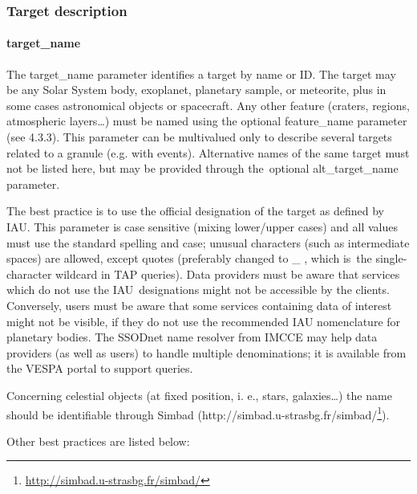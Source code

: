 \documentclass[11pt,a4paper]{ivoa}
\begin{document}
\subsubsection{Target description}

\paragraph{target\_name}

The target\_name parameter identifies a target by name or ID. The target may be any Solar System body, exoplanet, planetary sample, or meteorite, plus in some cases astronomical objects or spacecraft. Any other feature (craters, regions, atmospheric layers…) must be named using the optional feature\_name parameter (see 4.3.3). This parameter can be multivalued only to describe several targets related to a granule (e.g. with events). Alternative names of the same target must not be listed here, but may be provided through the optional alt\_target\_name parameter. 

The best practice is to use the official designation of the target as defined by IAU. This parameter is case sensitive (mixing lower/upper cases) and all values must use the standard spelling and case; unusual characters (such as intermediate spaces) are allowed, except quotes (preferably changed to \_ , which is the single-character wildcard in TAP queries). Data providers must be aware that services which do not use the IAU designations might not be accessible by the clients. Conversely, users must be aware that some services containing data of interest might not be visible, if they do not use the recommended IAU nomenclature for planetary bodies. The SSODnet name resolver from IMCCE may help data providers (as well as users) to handle multiple denominations; it is available from the VESPA portal to support queries.

Concerning celestial objects (at fixed position, i. e., stars, galaxies…) the name should be identifiable through Simbad (http://simbad.u-strasbg.fr/simbad/\footnote{\url{http://simbad.u-strasbg.fr/simbad/}}).

Other best practices are listed below:
\end{document}
